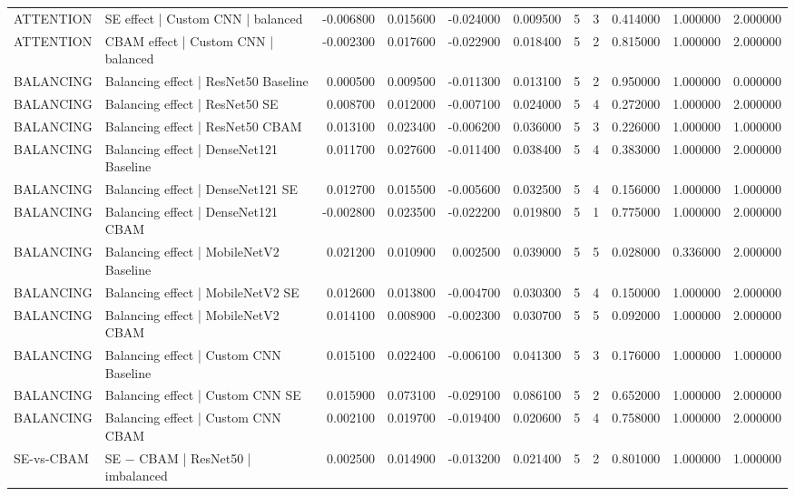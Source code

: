 \begin{tabular}{llrrrrrrrrr}
ATTENTION & SE effect | Custom CNN | balanced & -0.006800 & 0.015600 & -0.024000 & 0.009500 & 5 & 3 & 0.414000 & 1.000000 & 2.000000 \\
ATTENTION & CBAM effect | Custom CNN | balanced & -0.002300 & 0.017600 & -0.022900 & 0.018400 & 5 & 2 & 0.815000 & 1.000000 & 2.000000 \\
BALANCING & Balancing effect | ResNet50 Baseline & 0.000500 & 0.009500 & -0.011300 & 0.013100 & 5 & 2 & 0.950000 & 1.000000 & 0.000000 \\
BALANCING & Balancing effect | ResNet50 SE & 0.008700 & 0.012000 & -0.007100 & 0.024000 & 5 & 4 & 0.272000 & 1.000000 & 2.000000 \\
BALANCING & Balancing effect | ResNet50 CBAM & 0.013100 & 0.023400 & -0.006200 & 0.036000 & 5 & 3 & 0.226000 & 1.000000 & 1.000000 \\
BALANCING & Balancing effect | DenseNet121 Baseline & 0.011700 & 0.027600 & -0.011400 & 0.038400 & 5 & 4 & 0.383000 & 1.000000 & 2.000000 \\
BALANCING & Balancing effect | DenseNet121 SE & 0.012700 & 0.015500 & -0.005600 & 0.032500 & 5 & 4 & 0.156000 & 1.000000 & 1.000000 \\
BALANCING & Balancing effect | DenseNet121 CBAM & -0.002800 & 0.023500 & -0.022200 & 0.019800 & 5 & 1 & 0.775000 & 1.000000 & 2.000000 \\
BALANCING & Balancing effect | MobileNetV2 Baseline & 0.021200 & 0.010900 & 0.002500 & 0.039000 & 5 & 5 & 0.028000 & 0.336000 & 2.000000 \\
BALANCING & Balancing effect | MobileNetV2 SE & 0.012600 & 0.013800 & -0.004700 & 0.030300 & 5 & 4 & 0.150000 & 1.000000 & 2.000000 \\
BALANCING & Balancing effect | MobileNetV2 CBAM & 0.014100 & 0.008900 & -0.002300 & 0.030700 & 5 & 5 & 0.092000 & 1.000000 & 2.000000 \\
BALANCING & Balancing effect | Custom CNN Baseline & 0.015100 & 0.022400 & -0.006100 & 0.041300 & 5 & 3 & 0.176000 & 1.000000 & 1.000000 \\
BALANCING & Balancing effect | Custom CNN SE & 0.015900 & 0.073100 & -0.029100 & 0.086100 & 5 & 2 & 0.652000 & 1.000000 & 2.000000 \\
BALANCING & Balancing effect | Custom CNN CBAM & 0.002100 & 0.019700 & -0.019400 & 0.020600 & 5 & 4 & 0.758000 & 1.000000 & 2.000000 \\
SE-vs-CBAM & SE − CBAM | ResNet50 | imbalanced & 0.002500 & 0.014900 & -0.013200 & 0.021400 & 5 & 2 & 0.801000 & 1.000000 & 1.000000 \\

\end{tabular}

